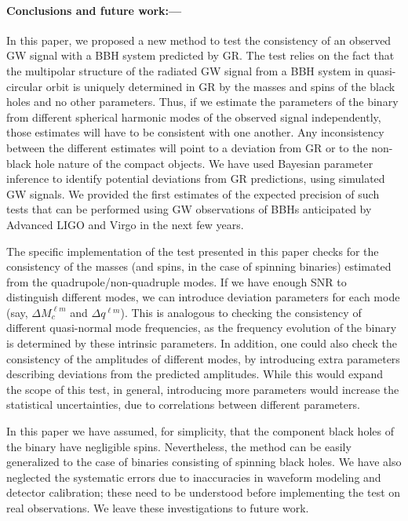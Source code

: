 \documentclass[prl,preprintnumbers,twocolumn,eqsecnum,floatfix,a4paper,nofootinbib,superscriptaddress]{revtex4}
\begin{document}
\paragraph{Conclusions and future work:---} In this paper, we proposed a new method to test the consistency of an observed GW signal with a BBH system predicted by GR. The test relies on the fact that the multipolar structure of the radiated GW signal from a BBH system in quasi-circular orbit is uniquely determined in GR by the masses and spins of the black holes and no other parameters. Thus, if we estimate the parameters of the binary from different spherical harmonic modes of the observed signal independently, those estimates will have to be consistent with one another. Any inconsistency between the different estimates will point to a deviation from GR or to the non-black hole nature of the compact objects. We have used Bayesian parameter inference to identify potential deviations from GR predictions, using simulated GW signals.  We provided the first estimates of the expected precision of such tests that can be performed using GW observations of BBHs anticipated by Advanced LIGO and Virgo in the next few years. 

The specific implementation of the test presented in this paper checks for the consistency of the masses (and spins, in the case of spinning binaries) estimated from the quadrupole/non-quadruple modes. If we have enough SNR to distinguish different modes, we can introduce deviation parameters for each mode (say, $\Delta M_c^{\ell m}$ and $\Delta q^{\ell m}$). This is analogous to checking the consistency of different quasi-normal mode frequencies, as the frequency evolution of the binary is determined by these intrinsic parameters. In addition, one could also check the consistency of the amplitudes of different modes, by introducing extra parameters describing deviations from the predicted amplitudes. While this would expand the scope of this test, in general, introducing more parameters would increase the statistical uncertainties, due to correlations between different parameters. 

In this paper we have assumed, for simplicity, that the component black holes of the binary have negligible spins. Nevertheless, the method can be easily generalized to the case of binaries consisting of spinning black holes. We have also neglected the systematic errors due to inaccuracies in waveform modeling and detector calibration; these need to be understood before implementing the test on real observations. We leave these investigations to future work. 
\end{document}
